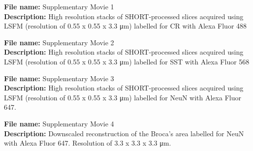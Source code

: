 \documentclass{article}
\begin{document}
\noindent \textbf{File name:} Supplementary Movie 1 \\ \textbf{Description:} High resolution stacks of SHORT-processed slices acquired using LSFM (resolution of 0.55 x 0.55 x 3.3 μm) labelled for CR with Alexa Fluor 488

\noindent \textbf{File name:} Supplementary Movie 2 \\ \textbf{Description:} High resolution stacks of SHORT-processed slices acquired using LSFM (resolution of 0.55 x 0.55 x 3.3 μm) labelled for SST with Alexa Fluor 568

\noindent \textbf{File name:} Supplementary Movie 3 \\ \textbf{Description:} High resolution stacks of SHORT-processed slices acquired using LSFM (resolution of 0.55 x 0.55 x 3.3 μm) labelled for NeuN with Alexa Fluor 647.

\noindent \textbf{File name:} Supplementary Movie 4 \\ \textbf{Description:} Downscaled reconstruction of the Broca’s area labelled for NeuN with Alexa Fluor 647. Resolution of 3.3 x 3.3 x 3.3 μm.
\end{document}
